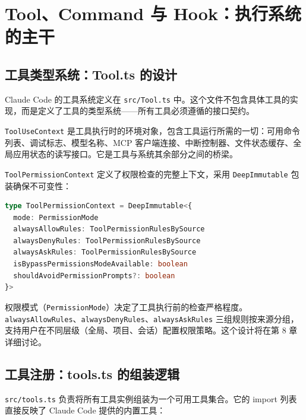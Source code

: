 \chapter{Tool、Command 与 Hook：执行系统的主干}

\section{工具类型系统：Tool.ts 的设计}

Claude Code 的工具系统定义在 \texttt{src/Tool.ts} 中。这个文件不包含具体工具的实现，而是定义了工具的类型系统——所有工具必须遵循的接口契约。

\texttt{ToolUseContext} 是工具执行时的环境对象，包含工具运行所需的一切：可用命令列表、调试标志、模型名称、MCP 客户端连接、中断控制器、文件状态缓存、全局应用状态的读写接口。它是工具与系统其余部分之间的桥梁。

\texttt{ToolPermissionContext} 定义了权限检查的完整上下文，采用 \texttt{DeepImmutable} 包装确保不可变性：

\begin{lstlisting}[language=TypeScript]
type ToolPermissionContext = DeepImmutable<{
  mode: PermissionMode
  alwaysAllowRules: ToolPermissionRulesBySource
  alwaysDenyRules: ToolPermissionRulesBySource
  alwaysAskRules: ToolPermissionRulesBySource
  isBypassPermissionsModeAvailable: boolean
  shouldAvoidPermissionPrompts?: boolean
}>
\end{lstlisting}

权限模式（\texttt{PermissionMode}）决定了工具执行前的检查严格程度。\texttt{alwaysAllowRules}、\texttt{alwaysDenyRules}、\texttt{alwaysAskRules} 三组规则按来源分组，支持用户在不同层级（全局、项目、会话）配置权限策略。这个设计将在第 8 章详细讨论。

\section{工具注册：tools.ts 的组装逻辑}

\texttt{src/tools.ts} 负责将所有工具实例组装为一个可用工具集合。它的 import 列表直接反映了 Claude Code 提供的内置工具：

